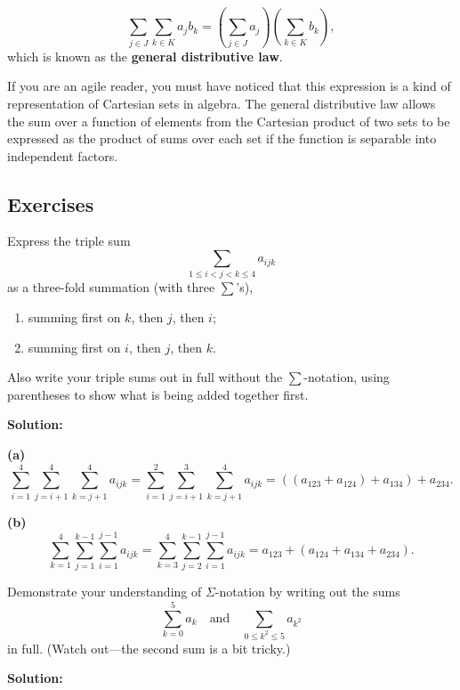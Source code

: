 \documentclass[
	12pt, %
	fleqn, %
	a4paper, %
]{LegrandOrangeBook}
\begin{document}
\begin{equation}
\sum_{j \in J} \sum_{k \in K} a_j b_k = \left( \sum_{j \in J} a_j \right) \left( \sum_{k \in K} b_k \right),
\end{equation}
which is known as the \textbf{general distributive law}.
\begin{remark}
    If you are an agile reader, you must have noticed that this expression is a kind of representation of Cartesian sets in algebra. The general distributive law allows the sum over a function of elements from the Cartesian product of two sets to be expressed as the product of sums over each set if the function is separable into independent factors.
\end{remark}
\subsection{Exercises}
\begin{exercise}
    Express the triple sum
\[
\sum_{1 \leq i < j < k \leq 4} a_{ijk}
\]
as a three-fold summation (with three \(\sum\)'s), 

\begin{enumerate}[label=\alph*.]
    \item summing first on \( k \), then \( j \), then \( i \);
    \item summing first on \( i \), then \( j \), then \( k \).
\end{enumerate}
Also write your triple sums out in full without the \(\sum\)-notation, using parentheses to show what is being added together first.
\end{exercise}
\textbf{Solution:}

\textbf{(a)} \[
\sum_{i=1}^{4} \sum_{j=i+1}^{4} \sum_{k=j+1}^{4} a_{ijk} = 
\sum_{i=1}^{2} \sum_{j=i+1}^{3} \sum_{k=j+1}^{4} a_{ijk} = 
((a_{123} + a_{124}) + a_{134}) + a_{234}.
\]

\textbf{(b)} \[
\sum_{k=1}^{4} \sum_{j=1}^{k-1} \sum_{i=1}^{j-1} a_{ijk} = 
\sum_{k=3}^{4} \sum_{j=2}^{k-1} \sum_{i=1}^{j-1} a_{ijk} = 
a_{123} + (a_{124} + a_{134} + a_{234}).
\]

\begin{exercise}
    Demonstrate your understanding of \(\Sigma\)-notation by writing out the sums
\[
\sum_{k=0}^{5} a_k \quad \text{and} \quad \sum_{0\leq k^2 \leq 5} a_{k^2}
\]
in full. (Watch out—the second sum is a bit tricky.)

\end{exercise}
\textbf{Solution:}
\end{document}
